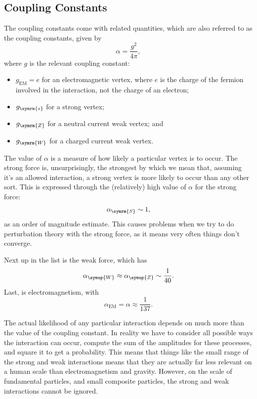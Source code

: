 \documentclass[fleqn]{NotesClass}
\newcommand{\Pparticle}[1]{\symup{#1}}
\newcommand{\PZ}{\ensuremath{\Pparticle{Z}}}
\newcommand{\PW}{\ensuremath{\Pparticle{W}}}
\newcommand{\strongCoupling}{g_{\symrm{s}}}
\newcommand{\wCoupling}{g_{\symrm{W}}}
\newcommand{\zCoupling}{g_{\symrm{Z}}}
\newcommand{\EM}{\text{EM}}
\newcommand{\strongForce}{\symrm{S}}
\begin{document}
    \subsection{Coupling Constants}
    The coupling constants come with related quantities, which are also referred to as the coupling constants, given by
    \begin{equation}
        \alpha = \frac{g^2}{4\pi},
    \end{equation}
    where \(g\) is the relevant coupling constant:
    \begin{itemize}
        \item \(g_{\EM} = e\) for an electromagnetic vertex, where \(e\) is the charge of the fermion involved in the interaction, not the charge of an electron;
        \item \(\strongCoupling\) for a strong vertex;
        \item \(\zCoupling\) for a neutral current weak vertex; and
        \item \(\wCoupling\) for a charged current weak vertex.
    \end{itemize}
    
    The value of \(\alpha\) is a measure of how likely a particular vertex is to occur.
    The strong force is, unsurprisingly, the strongest by which we mean that, assuming it's an allowed interaction, a strong vertex is more likely to occur than any other sort.
    This is expressed through the (relatively) high value of \(\alpha\) for the strong force:
    \begin{equation}
        \alpha_{\strongForce} \sim 1,
    \end{equation}
    as an order of magnitude estimate.
    This causes problems when we try to do perturbation theory with the strong force, as it means very often things don't converge.
    
    Next up in the list is the weak force, which has
    \begin{equation}
        \alpha_{\PW} \approx \alpha_{\PZ} \sim \frac{1}{40}.
    \end{equation}
    Last, is electromagnetism, with
    \begin{equation}
        \alpha_{\EM} = \alpha \approx \frac{1}{137}.
    \end{equation}
    
    The actual likelihood of any particular interaction depends on much more than the value of the coupling constant.
    In reality we have to consider all possible ways the interaction can occur, compute the sum of the amplitudes for these processes, and square it to get a probability.
    This means that things like the small range of the strong and weak interactions means that they are actually far less relevant on a human scale than electromagnetism and gravity.
    However, on the scale of fundamental particles, and small composite particles, the strong and weak interactions cannot be ignored.
    
\end{document}

